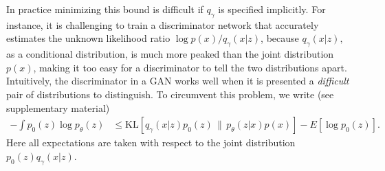 \documentclass{article}
\newcommand{\KL}[2]{\mbox{KL}\left[ #1 \,\|\, #2 \right]}
\newcommand{\Exp}[1]{{E}\left[ #1 \right]}
\begin{document}
In practice minimizing this bound is difficult if $q_\gamma$ is specified implicitly.
For instance, it is challenging to train a discriminator network 
that accurately estimates the unknown likelihood ratio $\log p(x) / q_\gamma(x|z)$, because $q_\gamma(x|z),$ as a conditional distribution, is much more peaked than the joint distribution $p(x)$, making it  too easy for
a discriminator to tell the two distributions apart. Intuitively, the discriminator in a GAN works well
when it is presented a
\emph{difficult} pair of distributions to distinguish.
To circumvent this problem, 
we write (see supplementary material)
\begin{align}
-\int p_0(z) \log p_\theta(z) 
& \leq \KL{q_\gamma(x|z) p_0(z)}{p_\theta(z|x)p(x)}
 - \Exp{\log p_0(z)}. \label{eq:ideal-kl_}
\end{align}
%
Here all expectations are taken with respect to the joint distribution $p_0(z) q_\gamma(x|z).$ %
\end{document}
